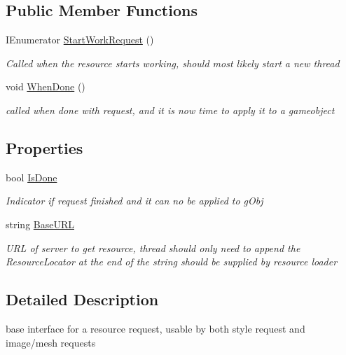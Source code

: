 \subsection*{Public Member Functions}
\begin{DoxyCompactItemize}
\item 
I\+Enumerator \mbox{\hyperlink{interface_i_resource_request_a5b40a09cb820283600ac9e3f846936f9}{Start\+Work\+Request}} ()
\begin{DoxyCompactList}\small\item\em Called when the resource starts working, should most likely start a new thread \end{DoxyCompactList}\item 
void \mbox{\hyperlink{interface_i_resource_request_a056e427fa6233602456ccb2d4c405aa0}{When\+Done}} ()
\begin{DoxyCompactList}\small\item\em called when done with request, and it is now time to apply it to a gameobject \end{DoxyCompactList}\end{DoxyCompactItemize}
\subsection*{Properties}
\begin{DoxyCompactItemize}
\item 
bool \mbox{\hyperlink{interface_i_resource_request_a3f805c8d561c119c795598b98611fb90}{Is\+Done}}
\begin{DoxyCompactList}\small\item\em Indicator if request finished and it can no be applied to g\+Obj \end{DoxyCompactList}\item 
string \mbox{\hyperlink{interface_i_resource_request_a6da6ac392229cc1a8a09d420ee4357dd}{Base\+U\+RL}}
\begin{DoxyCompactList}\small\item\em U\+RL of server to get resource, thread should only need to append the Resource\+Locator at the end of the string should be supplied by resource loader \end{DoxyCompactList}\end{DoxyCompactItemize}


\subsection{Detailed Description}
base interface for a resource request, usable by both style request and image/mesh requests 



